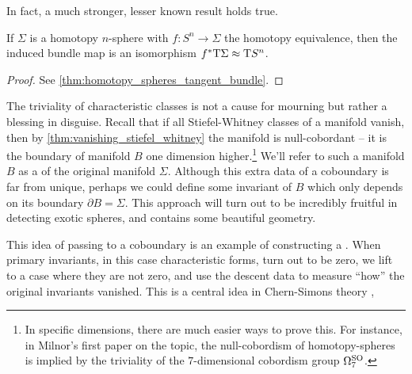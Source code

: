 In fact, a much stronger, lesser known result holds true.
\begin{theorem*}
	If $\Sigma$ is a homotopy $n$-sphere with $f : S^n \to \Sigma$ the homotopy equivalence, then the induced bundle map is an isomorphism $f^*\mathrm{T}\Sigma \approx \mathrm{T} S^n$.
\end{theorem*}
\begin{proof}
	See \cref{thm:homotopy_spheres_tangent_bundle}.
\end{proof}

The triviality of characteristic classes is not a cause for mourning but rather a blessing in disguise. Recall that if all Stiefel-Whitney classes of a manifold vanish, then by \cref{thm:vanishing_stiefel_whitney} the manifold is null-cobordant -- it is the boundary of manifold $B$ one dimension higher.\footnote{In specific dimensions, there are much easier ways to prove this. For instance, in Milnor's first paper \cite{milnor1956manifolds} on the topic, the null-cobordism of homotopy-spheres is implied by the triviality of the $7$-dimensional cobordism group $\Omega^{\operatorname{SO}}_7$.} We'll refer to such a manifold $B$ as a  of the original manifold $\Sigma$. Although this extra data of a coboundary is far from unique, perhaps we could define some invariant of $B$ which only depends on its boundary $\partial B=\Sigma$. This approach will turn out to be incredibly fruitful in detecting exotic spheres, and contains some beautiful geometry.

\begin{remark}
	This idea of passing to a coboundary is an example of constructing a . When primary invariants, in this case characteristic forms, turn out to be zero, we lift to a case where they are not zero, and use the descent data to measure ``how'' the original invariants vanished. This is a central idea in Chern-Simons theory \cite{chernsimons1974geometricinvariants}, 
\end{remark}


